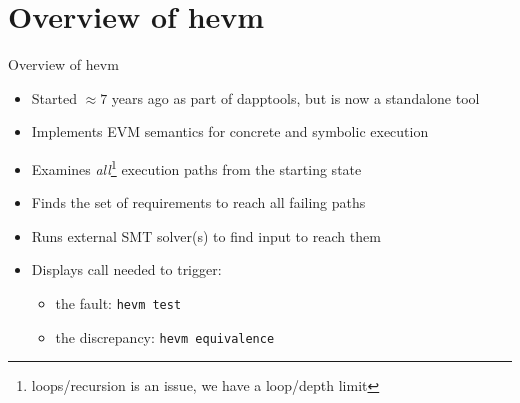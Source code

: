 \documentclass[aspectratio=169]{beamer}
\begin{document}
\section{Overview of hevm}
\begin{frame}{Overview of hevm}
\begin{itemize}
\item Started $\approx7$ years ago as part of dapptools, but is now a standalone tool
\item Implements EVM semantics for concrete and symbolic execution
\item Examines \emph{all}\footnote{loops/recursion is an issue, we have a loop/depth limit} execution paths from the starting state
\item Finds the set of requirements to reach all failing paths
\item Runs external SMT solver(s) to find input to reach them
\item Displays call needed to trigger:
\begin{itemize}
    \item the fault: \texttt{hevm test}
    \item the discrepancy: \texttt{hevm equivalence}
\end{itemize}
\end{itemize}
\end{frame}


%
%
%



%	
%
\end{document}

